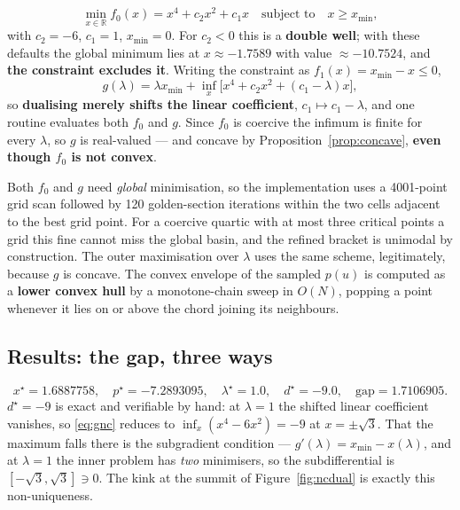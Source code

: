 \documentclass[11pt,a4paper]{article}
\theoremstyle{definition}
\newcommand{\R}{\mathbb{R}}
\newcommand{\pstar}{p^{\star}}
\newcommand{\dstar}{d^{\star}}
\newcommand{\xstar}{x^{\star}}
\newcommand{\lamstar}{\lambda^{\star}}
\begin{document}
\begin{equation}\label{eq:nc}
\min_{x\in\R} f_{0}(x)=x^{4}+c_{2}x^{2}+c_{1}x\quad\text{subject to}\quad x\ge x_{\min},
\end{equation}
with $c_{2}=-6$, $c_{1}=1$, $x_{\min}=0$. For $c_{2}<0$ this is a \textbf{double well}; with
these defaults the global minimum lies at $x\approx-1.7589$ with value $\approx-10.7524$, and
\textbf{the constraint excludes it}. Writing the constraint as $f_{1}(x)=x_{\min}-x\le 0$,
\begin{equation}\label{eq:gnc}
g(\lambda)=\lambda x_{\min}+\inf_{x}\bigl[x^{4}+c_{2}x^{2}+(c_{1}-\lambda)x\bigr],
\end{equation}
so \textbf{dualising merely shifts the linear coefficient}, $c_{1}\mapsto c_{1}-\lambda$, and one
routine evaluates both $f_{0}$ and $g$. Since $f_{0}$ is coercive the infimum is finite for every
$\lambda$, so $g$ is real-valued --- and concave by Proposition~\ref{prop:concave},
\textbf{even though $f_{0}$ is not convex}.

Both $f_{0}$ and $g$ need \emph{global} minimisation, so the implementation uses a 4001-point
grid scan followed by 120 golden-section iterations within the two cells adjacent to the best
grid point. For a coercive quartic with at most three critical points a grid this fine cannot
miss the global basin, and the refined bracket is unimodal by construction. The outer
maximisation over $\lambda$ uses the same scheme, legitimately, because $g$ is concave. The
convex envelope of the sampled $p(u)$ is computed as a \textbf{lower convex hull} by a
monotone-chain sweep in $O(N)$, popping a point whenever it lies on or above the chord joining
its neighbours.

\subsection{Results: the gap, three ways}

\[
\xstar=1.6887758,\quad \pstar=-7.2893095,\quad \lamstar=1.0,\quad \dstar=-9.0,\quad
\text{gap}=1.7106905.
\]
$\dstar=-9$ is exact and verifiable by hand: at $\lambda=1$ the shifted linear coefficient
vanishes, so \eqref{eq:gnc} reduces to $\inf_{x}(x^{4}-6x^{2})=-9$ at $x=\pm\sqrt{3}$. That the
maximum falls there is the subgradient condition --- $g'(\lambda)=x_{\min}-x(\lambda)$, and at
$\lambda=1$ the inner problem has \emph{two} minimisers, so the subdifferential is
$[-\sqrt{3},\sqrt{3}]\ni 0$. The kink at the summit of Figure~\ref{fig:ncdual} is exactly this
non-uniqueness.
\end{document}
